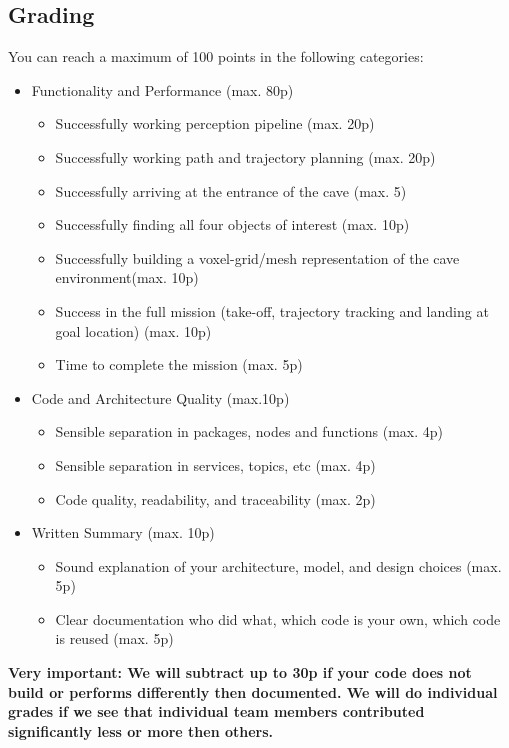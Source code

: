 \documentclass{article}
\begin{document}
\subsection{Grading}
You can reach a maximum of 100 points in the following categories:
\begin{itemize}
\item Functionality and Performance (max. 80p)
\begin{itemize}
\item Successfully working perception pipeline (max. 20p)
\item Successfully working path and trajectory planning (max. 20p)
\item Successfully arriving at the entrance of the cave (max. 5)
\item Successfully finding all four objects of interest (max. 10p)
\item Successfully building a voxel-grid/mesh representation of the cave environment(max. 10p)
\item Success in the full mission (take-off, trajectory tracking and landing at goal location) (max. 10p)
\item Time to complete the mission (max. 5p)
\end{itemize}

\item Code and Architecture Quality (max.10p)
\begin{itemize}
\item Sensible separation in packages, nodes and functions (max. 4p)
\item Sensible separation in services, topics, etc (max. 4p)
\item Code quality, readability, and traceability (max. 2p)
\end{itemize}


\item Written Summary (max. 10p)
\begin{itemize}
\item Sound explanation of your architecture, model, and design choices (max. 5p)
\item Clear documentation who did what, which code is your own, which code is reused (max. 5p)
\end{itemize}
\end{itemize}

\textbf{Very important: We will subtract up to 30p if your code does not build or performs differently then documented. We will do individual grades if we see that individual team members contributed significantly less or more then others.}
\end{document}
